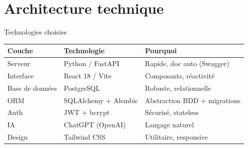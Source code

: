 \documentclass[aspectratio=169, 10pt]{beamer}
\begin{document}
\section{Architecture technique}

\begin{frame}{Technologies choisies}
\small
\begin{center}
\begin{tabular}{l l l}
\toprule
\textbf{Couche} & \textbf{Technologie} & \textbf{Pourquoi} \\
\midrule
Serveur & Python / FastAPI & Rapide, doc auto (Swagger) \\
\rowcolor{light}
Interface & React 18 / Vite & Composants, réactivité \\
Base de données & PostgreSQL & Robuste, relationnelle \\
\rowcolor{light}
ORM & SQLAlchemy + Alembic & Abstraction BDD + migrations \\
Auth & JWT + bcrypt & Sécurisé, stateless \\
\rowcolor{light}
IA & ChatGPT (OpenAI) & Langage naturel \\
Design & Tailwind CSS & Utilitaire, responsive \\
\bottomrule
\end{tabular}
\end{center}
\end{frame}
\end{document}
